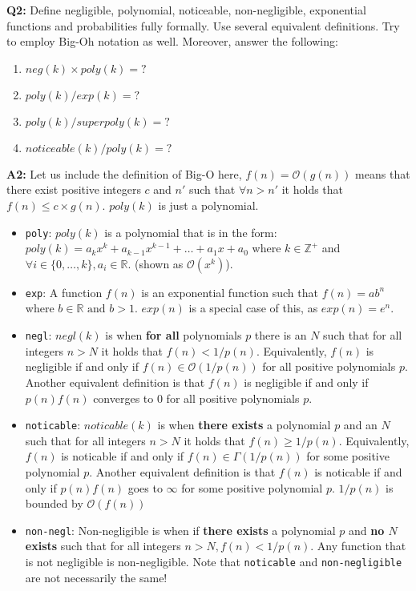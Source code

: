 \documentclass[12pt,reqno]{amsart}
\newcommand{\code}[1]{\texttt{#1}}
\newcommand{\mand}[0]{\text{ and }}
\begin{document}
\vspace{20px}
\textbf{Q2:} Define negligible, polynomial, noticeable, non-negligible, exponential functions and probabilities fully formally. Use several equivalent definitions. Try to employ Big-Oh notation as well. Moreover, answer the following:
\begin{enumerate}[label=\alph*.]
 \item $neg(k) \times poly(k) = ?$
 \item $poly(k) / exp(k) = ?$
 \item $poly(k) / superpoly(k) = ?$
 \item $noticeable(k) / poly(k) = ?$
\end{enumerate} 

\textbf{A2:} Let us include the definition of Big-O here, $f(n) = \mathcal{O}(g(n))$ means that there exist positive integers $c$ and $n'$ such that $\forall n > n'$ it holds that $f(n) \leq c\times g(n)$. $poly(k)$ is just a polynomial. 
\begin{itemize}
\item \code{poly}: $poly(k)$ is a polynomial that is in the form: $poly(k) = a_kx^k + a_{k-1}x^{k-1} + \ldots + a_1x + a_0$ where $k \in \mathbb{Z}^+$ and $\forall i \in \{0, \ldots, k\}, a_i \in \mathbb{R}$. (shown as $\mathcal{O}(x^k)$). 
 \item \code{exp}: A function $f(n)$ is an exponential function such that $f(n)=ab^n$ where $b \in \mathbb{R} \mand b>1$. $exp(n)$ is a special case of this, as $exp(n)=e^n$. 
 \item \code{negl}: $negl(k)$ is when \textbf{for all} polynomials $p$ there is an $N$ such that for all integers $n > N$ it holds that $f(n) < 1/p(n)$. Equivalently, $f(n)$ is negligible if and only if $f(n) \in \mathcal{O}(1/p(n))$ for all positive polynomials $p$. Another equivalent definition is that $f(n)$ is negligible if and only if $p(n)f(n)$ converges to 0 for all positive polynomials $p$.
  \item \code{noticable}: $noticable(k)$ is when \textbf{there exists} a polynomial $p$ and an $N$ such that for all integers $n > N$ it holds that $f(n) \geq 1/p(n)$. Equivalently, $f(n)$ is noticable if and only if $f(n) \in \mathcal{\Gamma}(1/p(n))$ for some positive polynomial $p$. Another equivalent definition is that $f(n)$ is noticable if and only if $p(n)f(n)$ goes to $\infty$ for some positive polynomial $p$. $1/p(n)$ is bounded by $ \mathcal{O}(f(n))$
 \item \code{non-negl}: Non-negligible is when if \textbf{there exists} a polynomial $p$ and \textbf{no $N$ exists} such that for all integers $n > N, f(n) < 1/p(n)$. Any function that is not negligible is non-negligible. Note that \code{noticable} and \code{non-negligible} are not necessarily the same! 
\end{itemize}
\end{document}
